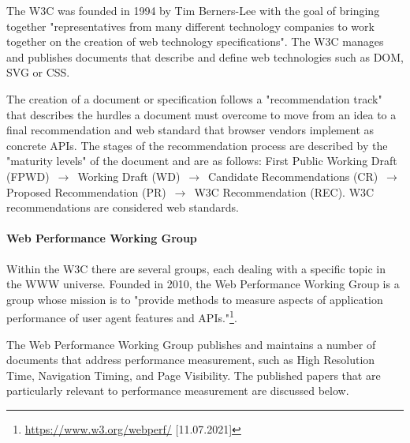 The W3C was founded in 1994 by Tim Berners-Lee with the goal of bringing together "representatives from many different technology companies to work together on the creation of web technology specifications". %
The W3C manages and publishes documents that describe and define web technologies such as DOM, SVG or CSS. %



The creation of a document or specification follows a "recommendation track" that describes the hurdles a document must overcome to move from an idea to a final recommendation and web standard that browser vendors implement as concrete APIs. %
The stages of the recommendation process are described by the "maturity levels" of the document and are as follows:
First Public Working Draft (FPWD) $\,\to\,$ Working Draft (WD) $\,\to\,$ Candidate Recommendations (CR) $\,\to\,$ Proposed Recommendation (PR) $\,\to\,$ W3C Recommendation (REC).  %
W3C recommendations are considered web standards. %



\paragraph{Web Performance Working Group} %


Within the W3C there are several groups, each dealing with a specific topic in the WWW universe. %
Founded in 2010, the Web Performance Working Group is a group whose mission is to "provide methods to measure aspects of application performance of user agent features and APIs."\footnote{\url{https://www.w3.org/webperf/} [11.07.2021]}.


The Web Performance Working Group publishes and maintains a number of documents that address performance measurement, such as High Resolution Time, Navigation Timing, and Page Visibility. %
The published papers that are particularly relevant to performance measurement are discussed below.

